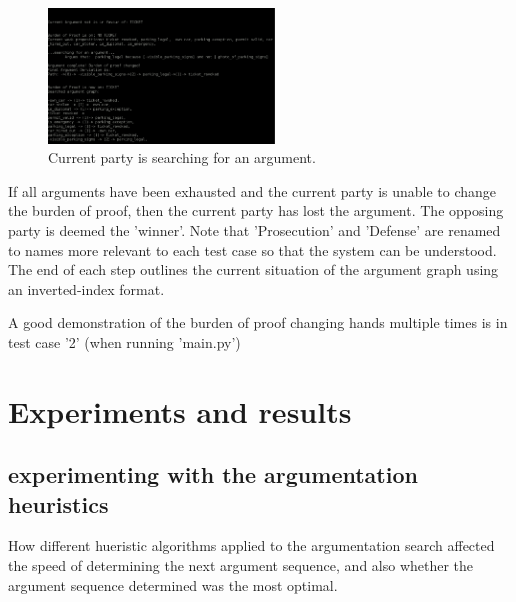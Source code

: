 \documentclass[10pt,a4paper,twocolumn]{article}
\begin{document}
\begin{figure}[h!]
	\label{screen2}
	\includegraphics[width=6cm]{images/screeen2.png}
	\centering
	\caption{Current party is searching for an argument.}
\end{figure}

If all arguments have been exhausted and the current party is unable to change
the burden of proof, then the current party has lost the argument. The opposing
party is deemed the 'winner'. Note that 'Prosecution' and 'Defense' are renamed
to names more relevant to each test case so that the system can be understood.
The end of each step outlines the current situation of the argument graph using
an inverted-index format.

A good demonstration of the burden of proof changing hands multiple times is in
test case '2' (when running 'main.py')

\section{Experiments and results}

\subsection{experimenting with the argumentation heuristics}
How different hueristic algorithms applied to the argumentation search affected
the speed of determining the next argument sequence, and also whether the
argument sequence determined was the most optimal.
\end{document}
